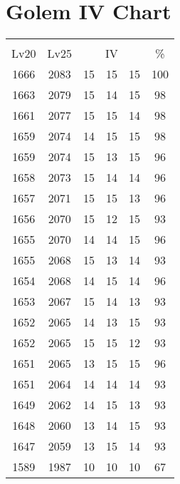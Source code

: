 \documentclass{article}%
\begin{document}
%
\normalsize%
\section{Golem IV Chart}%
\label{sec:Golem IV Chart}%
\renewcommand{\arraystretch}{1.5}%
\begin{tabular}{|c|c|c|c|c|c|}%
\hline%
\multicolumn{6}{|c|}{\textcolor{white}{ 
\linebreak{Golem}
}%
\cellcolor{black}}\\%
\multicolumn{1}{|c}{Lv20}&\multicolumn{1}{c|}{Lv25}&\multicolumn{3}{c|}{IV}&\multicolumn{1}{|c|}{\%}\\%
\hline%
\rowcolor{color100}%
1666&2083&15&15&15&100\\%
\hline%
\rowcolor{color98}%
1663&2079&15&14&15&98\\%
\hline%
\rowcolor{color98}%
1661&2077&15&15&14&98\\%
\hline%
\rowcolor{color98}%
1659&2074&14&15&15&98\\%
\hline%
\rowcolor{color96}%
1659&2074&15&13&15&96\\%
\hline%
\rowcolor{color96}%
1658&2073&15&14&14&96\\%
\hline%
\rowcolor{color96}%
1657&2071&15&15&13&96\\%
\hline%
\rowcolor{color93}%
1656&2070&15&12&15&93\\%
\hline%
\rowcolor{color96}%
1655&2070&14&14&15&96\\%
\hline%
\rowcolor{color93}%
1655&2068&15&13&14&93\\%
\hline%
\rowcolor{color96}%
1654&2068&14&15&14&96\\%
\hline%
\rowcolor{color93}%
1653&2067&15&14&13&93\\%
\hline%
\rowcolor{color93}%
1652&2065&14&13&15&93\\%
\hline%
\rowcolor{color93}%
1652&2065&15&15&12&93\\%
\hline%
\rowcolor{color96}%
1651&2065&13&15&15&96\\%
\hline%
\rowcolor{color93}%
1651&2064&14&14&14&93\\%
\hline%
\rowcolor{color93}%
1649&2062&14&15&13&93\\%
\hline%
\rowcolor{color93}%
1648&2060&13&14&15&93\\%
\hline%
\rowcolor{color93}%
1647&2059&13&15&14&93\\%
\hline%
\rowcolor{color91}%
1589&1987&10&10&10&67\\%
\end{tabular}

%
\end{document}
